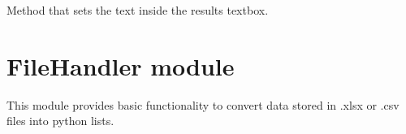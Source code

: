 \documentclass[letterpaper,10pt,english]{sphinxmanual}
\begin{document}
\begin{fulllineitems}
\begin{fulllineitems}
\end{fulllineitems}


\begin{fulllineitems}
\label{\detokenize{CTkResultInterface:src.CTkResultInterface.ResultInterface.set_result_label_text}}
\pysigstartsignatures
{}
\pysigstopsignatures
\sphinxAtStartPar
Method that sets the text inside the results textbox.

\end{fulllineitems}


\end{fulllineitems}


\sphinxstepscope


\chapter{FileHandler module}
\label{\detokenize{FileHandler:module-src.FileHandler}}\label{\detokenize{FileHandler:filehandler-module}}\label{\detokenize{FileHandler::doc}}
\sphinxAtStartPar
This module provides basic functionality to convert data stored in .xlsx or .csv files into python
lists.
\end{document}
